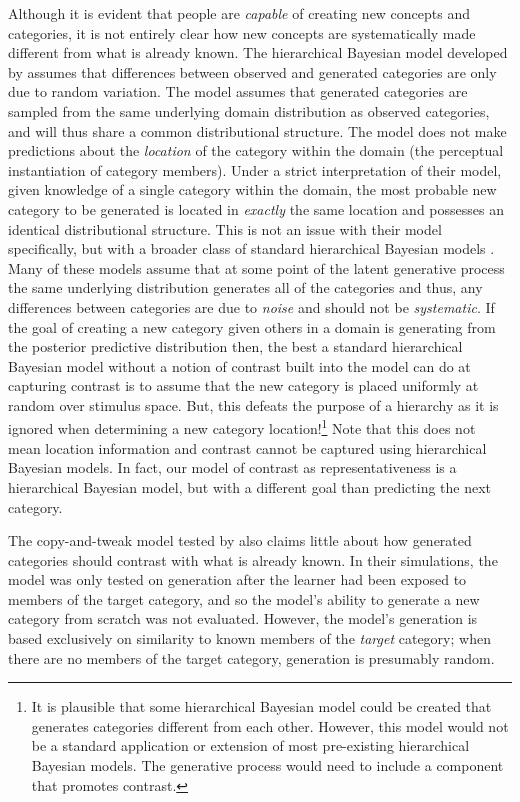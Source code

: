 \documentclass[12pt]{article}
\begin{document}
\begin{flushleft}
Although it is evident that people are {\em capable} of creating new concepts and categories, it is not entirely clear how new concepts are systematically made different from what is already known. The hierarchical Bayesian model developed by \cite{jern2013probabilistic} assumes that differences between observed and generated categories are only due to random variation. The model assumes that generated categories are sampled from the same underlying domain distribution as observed categories, and will thus share a common distributional structure. The model does not make predictions about the {\em location} of the category within the domain (the perceptual instantiation of category members). Under a strict interpretation of their model, given knowledge of a single category within the domain, the most probable new category to be generated is located in {\em exactly} the same location and possesses an identical distributional structure. This is not an issue with their model specifically, but with a broader class of standard hierarchical Bayesian models \citep[e.g., ][]{griffithsscn07,kemp07}. Many of these models assume that at some point of the latent generative process the same underlying distribution generates all of the categories and thus, any differences between categories are due to {\em noise} and should not be {\em systematic}. If the goal of creating a new category given others in a domain is generating from the posterior predictive distribution then, the best a standard hierarchical Bayesian model without a notion of contrast built into the model can do at capturing contrast is to assume that the new category is placed uniformly at random over stimulus space. But, this defeats the purpose of a hierarchy as it is ignored when determining a new category location!\footnote{It is plausible that some hierarchical Bayesian model could be created that generates categories different from each other. However, this model would not be a standard application or extension of most pre-existing hierarchical Bayesian models. The generative process would need to include a component that promotes contrast.} Note that this does not mean location information and contrast cannot be captured using hierarchical Bayesian models. In fact, our model of contrast as representativeness is a hierarchical Bayesian model, but with a different goal than predicting the next category. 

The copy-and-tweak model tested by \cite{jern2013probabilistic} also claims little about how generated categories should contrast with what is already known. In their simulations, the model was only tested on generation after the learner had been exposed to members of the target category, and so the model's ability to generate a new category from scratch was not evaluated. However, the model's generation is based exclusively on similarity to known members of the {\em target} category; when there are no members of the target category, generation is presumably random.


\end{flushleft}
\end{document}
